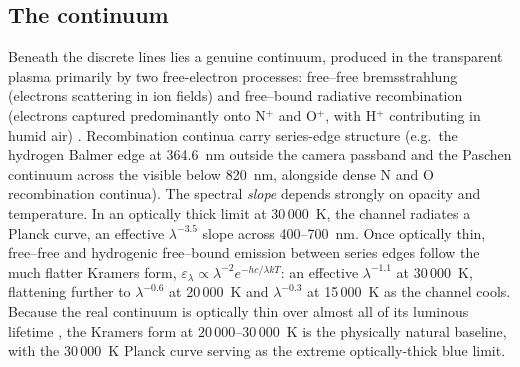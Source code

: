 \documentclass[11pt,a4paper]{article}
\begin{document}
\subsection{The continuum}
Beneath the discrete lines lies a genuine continuum, produced in the
transparent plasma primarily by two free-electron processes: free--free
bremsstrahlung (electrons scattering in ion fields) and free--bound radiative
recombination (electrons captured predominantly onto N$^+$ and O$^+$, with
H$^+$ contributing in humid air) \citep{uman1965,zeldovich1966,orvillehenderson1984}.
Recombination continua carry series-edge structure (e.g.\ the hydrogen Balmer
edge at 364.6~nm outside the camera passband and the Paschen continuum across
the visible below 820~nm, alongside dense N and O recombination continua).
The spectral \emph{slope} depends strongly on opacity and temperature. In an
optically thick limit at 30\,000~K, the channel radiates a Planck curve, an
effective $\lambda^{-3.5}$ slope across 400--700~nm. Once optically thin,
free--free and hydrogenic free--bound emission between series edges follow the
much flatter Kramers form, $\varepsilon_\lambda \propto \lambda^{-2}
e^{-hc/\lambda kT}$: an effective $\lambda^{-1.1}$ at 30\,000~K, flattening
further to $\lambda^{-0.6}$ at 20\,000~K and $\lambda^{-0.3}$ at 15\,000~K as
the channel cools. Because the real continuum is optically thin over almost
all of its luminous lifetime \citep{uman1965}, the Kramers form at
20\,000--30\,000~K is the physically natural baseline, with the 30\,000~K
Planck curve serving as the extreme optically-thick blue limit.
\end{document}
